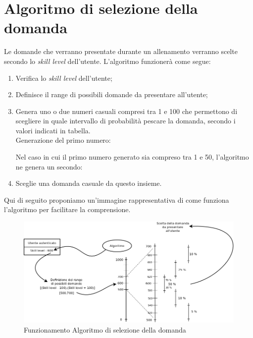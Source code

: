 \section{Algoritmo di selezione della domanda}
Le domande che verranno presentate durante un allenamento verranno scelte secondo lo \textit{skill level} dell'utente. L'algoritmo funzionerà come segue:
\begin{enumerate}
	\item Verifica lo \textit{skill level} dell'utente;
	\item Definisce il range di possibili domande da presentare all'utente;
	\item Genera uno o due numeri casuali compresi tra 1 e 100 che permettono di scegliere in quale intervallo di probabilità pescare la domanda, secondo i valori indicati in tabella.\\
Generazione del primo numero:
	
\begin{center}
\end{center}

Nel caso in cui il primo numero generato sia compreso tra 1 e 50, l'algoritmo ne genera un secondo:

\begin{center}
\end{center}

	\item Sceglie una domanda casuale da questo insieme.
\end{enumerate}
Qui di seguito proponiamo un'immagine rappresentativa di come funziona l'algoritmo per facilitare la comprensione.

\begin{figure}[ht]
	\centering
	\includegraphics[scale=0.30]{UML/algoritmo.png}
	\caption{Funzionamento Algoritmo di selezione della domanda}
\end{figure}
\FloatBarrier

